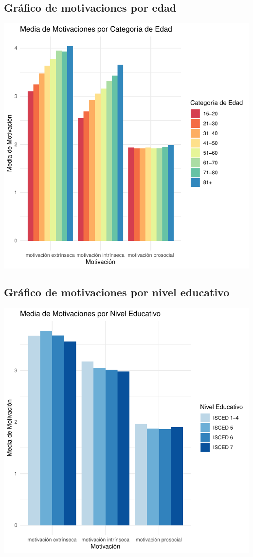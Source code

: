 \documentclass{article}
\begin{document}
\subsection{Gráfico de motivaciones por edad}
\includegraphics{Ejemplo-007}


\subsection{Gráfico de motivaciones por nivel educativo}
\includegraphics{Ejemplo-008}
\end{document}
